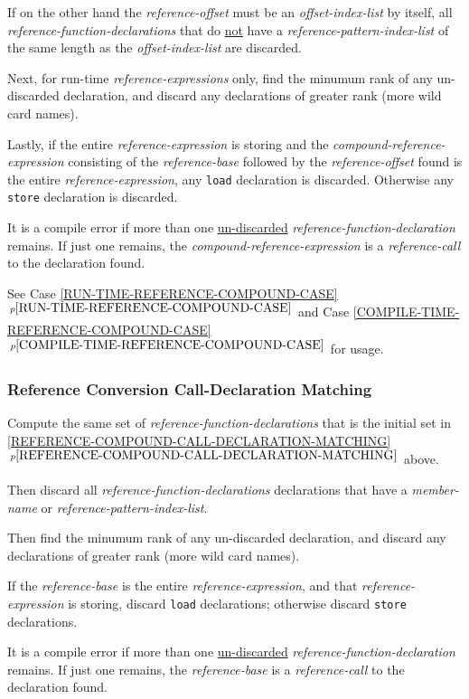 \documentclass[12pt]{article}
\newcommand{\itemref}[1]{\ref{#1}$\,^{p\pageref{#1}}$}
\begin{document}
If on the other hand the
{\em reference-offset} must be an
{\em offset-index-list} by itself,
all {\em reference-function-declarations}
that do \underline{not} have a
{\em reference-pattern-index-list} of the same length
as the {\em offset-index-list} are discarded.

Next, for run-time {\em reference-expressions} only,
find the minumum rank of any un-discarded declaration,
and discard any declarations of greater rank (more wild card names).

Lastly, if the entire {\em reference-expression} is storing
and the {\em compound-reference-expression} consisting of the
{\em reference-base} followed by the {\em reference-offset} found
is the entire {\em reference-expression},
any {\tt load} declaration is discarded.
Otherwise any {\tt store} declaration is discarded.

It is a compile error if more than one
\underline{un-discarded} {\em reference-function-declaration}
remains.  If just one remains, the {\em compound-reference-expression}
is a {\em reference-call} to the declaration found.

See Case \itemref{RUN-TIME-REFERENCE-COMPOUND-CASE}
and Case \itemref{COMPILE-TIME-REFERENCE-COMPOUND-CASE}
for usage.

\subsubsection{Reference Conversion Call-Declaration Matching}
\label{REFERENCE-CONVERSION-CALL-DECLARATION-MATCHING}

Compute the same set of {\em reference-function-declarations}
that is the initial set in
\itemref{REFERENCE-COMPOUND-CALL-DECLARATION-MATCHING} above.

Then discard all
{\em reference-function-declarations} declarations that have
a {\em member-name} or {\em reference-pattern-index-list}.

Then find the minumum rank of any un-discarded declaration,
and discard any declarations of greater rank (more wild card names).

If the {\em reference-base} is the entire {\em reference-expression},
and that {\em reference-expression} is storing, discard {\tt load}
declarations; otherwise discard {\tt store} declarations.

It is a compile error if more than one
\underline{un-discarded} {\em reference-function-declaration}
remains.  If just one remains, the {\em reference-base}
is a {\em reference-call} to the declaration found.
\end{document}
